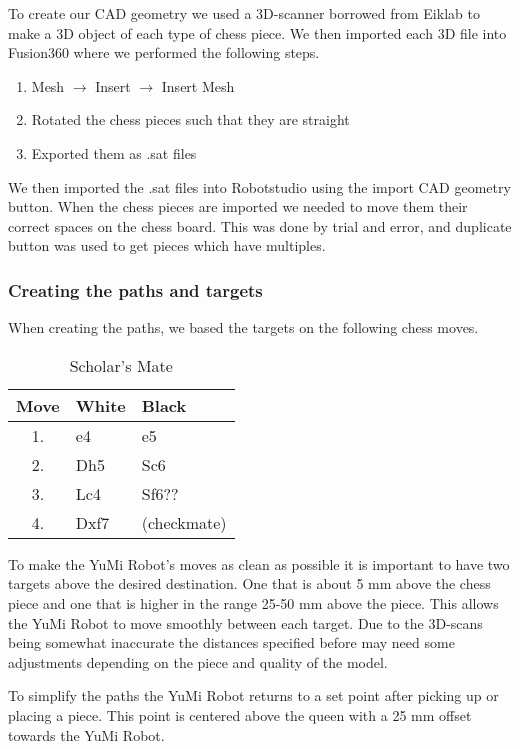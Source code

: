 \documentclass[a4paper,12pt]{article}
\begin{document}
To create our CAD geometry we used a 3D-scanner borrowed from Eiklab to make a 3D object of each type of chess piece. We then imported each 3D file into Fusion360 where we performed the following steps.
\begin{enumerate}
    \item Mesh $\rightarrow$ Insert $\rightarrow$ Insert Mesh
    \item Rotated the chess pieces such that they are straight
    \item Exported them as .sat files
\end{enumerate}
We then imported the .sat files into Robotstudio using the import CAD geometry button. When the chess pieces are imported we needed to move them their correct spaces on the chess board. This was done by trial and error, and duplicate button was used to get pieces which have multiples.

\subsubsection{Creating the paths and targets}
\label{sec:Challenge_paths_targets}
When creating the paths, we based the targets on the following chess moves.

\begin{table}[h] %
    \centering
    \begin{tabular}{c l l}
        \hline
        Move & White & Black \\
        \hline
        1. & e4 & e5 \\
        2. & Dh5 & Sc6 \\
        3. & Lc4 & Sf6?? \\
        4. & Dxf7 & (checkmate) \\
        \hline
    \end{tabular}
    \caption{Scholar's Mate}
    \label{tab:chess_moves}
\end{table}
To make the YuMi Robot's moves as clean as possible it is important to have two targets above the desired destination. One that is about 5 mm above the chess piece and one that is higher in the range 25-50 mm above the piece. This allows the YuMi Robot to move smoothly between each target. Due to the 3D-scans being somewhat inaccurate the distances specified before may need some adjustments depending on the piece and quality of the model.

To simplify the paths the YuMi Robot returns to a set point after picking up or placing a piece. This point is centered above the queen with a 25 mm offset towards the YuMi Robot. 
\end{document}
